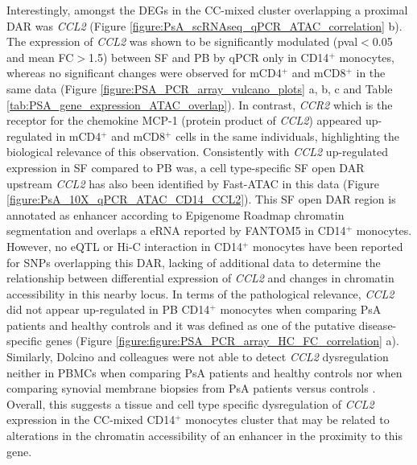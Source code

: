 Interestingly, amongst the DEGs in the CC-mixed cluster overlapping a proximal DAR was \textit{CCL2} (Figure \ref{figure:PsA_scRNAseq_qPCR_ATAC_correlation} b). The expression of \textit{CCL2} was shown to be significantly modulated (pval$<$0.05 and mean FC$>$1.5) between SF and PB by qPCR only in CD14$^+$ monocytes, whereas no significant changes were observed for mCD4$^+$ and mCD8$^+$ in the same data (Figure \ref{figure:PSA_PCR_array_vulcano_plots} a, b, c and Table \ref{tab:PSA_gene_expression_ATAC_overlap}). In contrast, \textit{CCR2} which is the receptor for the chemokine MCP-1 (protein product of \textit{CCL2}) appeared up-regulated in mCD4$^+$ and mCD8$^+$ cells in the same individuals, highlighting the biological relevance of this observation. Consistently with \textit{CCL2} up-regulated expression in SF compared to PB was, a cell type-specific SF open DAR upstream \textit{CCL2} has also been identified by Fast-ATAC in this data (Figure \ref{figure:PsA_10X_qPCR_ATAC_CD14_CCL2}). This SF open DAR region is annotated as enhancer according to Epigenome Roadmap chromatin segmentation and overlaps a eRNA reported by FANTOM5 in CD14$^+$ monocytes. However, no eQTL or Hi-C interaction in CD14$^+$ monocytes have been reported for SNPs overlapping this DAR, lacking of additional data to determine the relationship between differential expression of \textit{CCL2} and changes in chromatin accessibility in this nearby locus. In terms of the pathological relevance, \textit{CCL2} did not appear up-regulated in PB CD14$^+$ monocytes when comparing PsA patients and healthy controls and it was defined as one of the putative disease-specific genes (Figure \ref{figure:figure:PSA_PCR_array_HC_FC_correlation} a). Similarly, Dolcino and colleagues were not able to detect \textit{CCL2} dysregulation neither in PBMCs when comparing PsA patients and healthy controls nor when comparing synovial membrane biopsies from PsA patients versus controls \parencite{Dolcino2015}. Overall, this suggests a tissue and cell type specific dysregulation of \textit{CCL2} expression in the CC-mixed CD14$^+$ monocytes cluster that may be related to alterations in the chromatin accessibility of an enhancer in the proximity to this gene.

